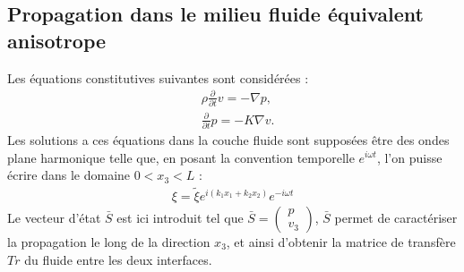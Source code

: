 \documentclass[12pt]{report}
\begin{document}
\subsection{Propagation dans le milieu fluide équivalent anisotrope}
\label{Ch_Prop_S_Pb_SS_Eul}
    Les équations constitutives suivantes sont considérées :
    \begin{align}
	&\rho \frac{\partial}{\partial t}v=-\nabla p,\label{Const1} \\
	&\frac{\partial}{\partial t}p=-K\nabla v.\label{Const2}
    \end{align}
    Les solutions a ces équations dans la couche fluide sont supposées être  des ondes plane harmonique telle que, en posant la convention temporelle $e^{i\omega t}$, l'on puisse écrire dans le domaine $0<x_3<L$ :
    \begin{align}
        \xi=\tilde{\xi}e^{i(k_1 x_1+k_2 x_2)}e^{-i\omega t}\label{Convention_k_t}
    \end{align}
    Le vecteur d'état $\bar{S}$ est ici introduit tel que $\bar{S}=\begin{pmatrix} p \\ v_3 \end{pmatrix}$, $\bar{S}$ permet de caractériser la propagation le long de la direction $x_3$, et ainsi d'obtenir la matrice de transfère $Tr$ du fluide entre les deux interfaces.
    
\end{document}
